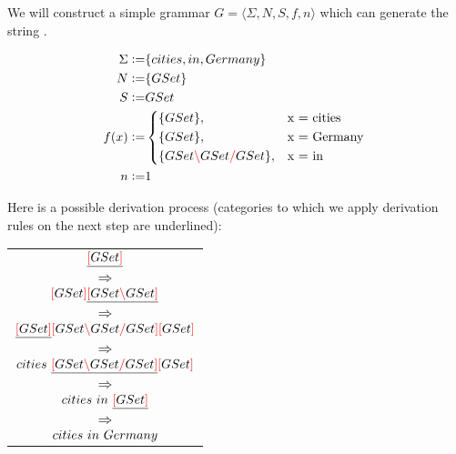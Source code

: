\documentclass[main.tex]{subfiles}
\begin{document}
\begin{example}
    \label{ex:deriv}

    We will construct a simple grammar $G = \langle \Sigma, N, S, f, n \rangle$
    which can generate the string .

    \begin{align*}
        \Sigma \defeq& \{ cities, in, Germany \} \\
        N \defeq& \{ GSet \} \\
        S \defeq& GSet \\
        f(x) \defeq&
            \begin{cases*}
                \{ GSet \},& x = cities \\
                \{ GSet \},& x = Germany \\
                \{ GSet \lc GSet \rc GSet \},& x = in \\
            \end{cases*} \\
        n \defeq& 1 \\
    \end{align*}

    Here is a possible derivation process (categories to which we apply
    derivation rules on the next step are underlined):
    \begin{center}
        \begin{tabular}{c}
            $\underline{\textcolor{red}{[} GSet \textcolor{red}{]}}$ \\ $\Rightarrow$ \\
            $\textcolor{red}{[} GSet \textcolor{red}{]} \underline{\textcolor{red}{[} GSet \textcolor{red}{\backslash} GSet \textcolor{red}{]}}$ \\ $\Rightarrow$ \\
            $\underline{\textcolor{red}{[} GSet \textcolor{red}{]}} \textcolor{red}{[} GSet \textcolor{red}{\backslash} GSet \textcolor{red}{/} GSet \textcolor{red}{]} \textcolor{red}{[} GSet \textcolor{red}{]}$ \\ $\Rightarrow$ \\
            $cities \text{ } \underline{\textcolor{red}{[} GSet \textcolor{red}{\backslash} GSet \textcolor{red}{/} GSet \textcolor{red}{]}} \textcolor{red}{[} GSet \textcolor{red}{]}$ \\ $\Rightarrow$ \\
            $cities \text{ } in \text{ } \underline{\textcolor{red}{[} GSet \textcolor{red}{]}}$ \\ $\Rightarrow$ \\
            $cities \text{ } in \text{ } Germany$ \\
        \end{tabular}
    \end{center}
\end{example}
\end{document}
